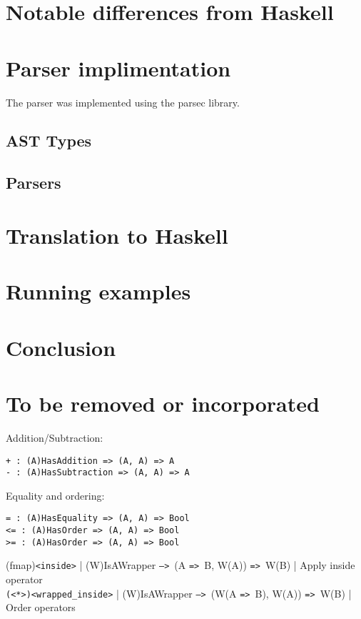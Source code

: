 \documentclass{article}
\def\H{Haskell}
\def\ra{\texttt{=>}\ }
\def\Ra{\texttt{-->}\ }
\begin{document}
\section{Notable differences from \H}

\section{Parser implimentation}

The parser was implemented using the parsec library.

\subsection{AST Types}

\subsection{Parsers}

\section{Translation to \H}
\section{Running examples}
\section{Conclusion}

\section{To be removed or incorporated}

Addition/Subtraction:
\begin{verbatim}
+ : (A)HasAddition => (A, A) => A
- : (A)HasSubtraction => (A, A) => A
\end{verbatim}
Equality and ordering:
\begin{verbatim}
= : (A)HasEquality => (A, A) => Bool
<= : (A)HasOrder => (A, A) => Bool
>= : (A)HasOrder => (A, A) => Bool
\end{verbatim}

(fmap)\texttt{<inside>} | (W)IsAWrapper \Ra (A \ra B, W(A)) \ra W(B) | Apply inside operator \\
\texttt{(<*>)<wrapped_inside>} | (W)IsAWrapper \Ra (W(A \ra B), W(A)) \ra W(B) | Order operators \\
\end{document}
